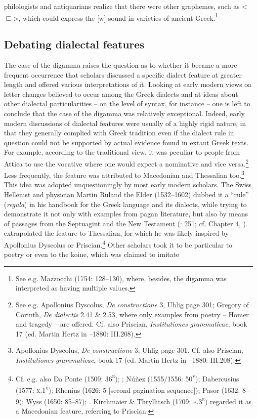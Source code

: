 \documentclass[output=paper]{langsci/langscibook}
\begin{document}
\begin{styleCatalogusnotities}
philologists and antiquarians realize that there were other graphemes, such as <${\sqsubset}$>, which could express the [w] sound in varieties of ancient Greek.\footnote{ \textrm{See e.g. Mazzocchi (1754: 128–130), where, besides, the digamma was interpreted as having multiple values.}}
\end{styleCatalogusnotities}

\subsection{Debating dialectal features}
\hypertarget{Toc19704847}{}
The case of the digamma raises the question as to whether it became a more frequent occurrence that scholars discussed a specific dialect feature at greater length and offered various interpretations of it. Looking at early modern views on letter changes believed to occur among the Greek dialects and at ideas about other dialectal particularities – on the level of syntax, for instance – one is left to conclude that the case of the digamma was relatively exceptional. Indeed, early modern discussions of dialectal features were usually of a highly rigid nature, in that they generally complied with Greek tradition even if the dialect rule in question could not be supported by actual evidence found in extant Greek texts. For example, according to the traditional view, it was peculiar to people from Attica to use the vocative where one would expect a nominative and vice versa.\footnote{See e.g. Apollonius Dyscolus, \textit{De} \textit{constructione} 3, Uhlig page 301; Gregory of Corinth, \textit{De} \textit{dialectis} 2.41 \& 2.53, where only examples from poetry – Homer and tragedy – are offered. Cf. also Priscian, \textit{Institutiones} \textit{grammaticae}, book 17 (ed. Martin Hertz in \citealt{Keil1855}–1880: III.208).} Less frequently, the feature was attributed to Macedonian and Thessalian too.\footnote{Apollonius Dyscolus, \textit{De} \textit{constructione} 3, Uhlig page 301. Cf. also Priscian, \textit{Institutiones} \textit{grammaticae}, book 17 (ed. Martin Hertz in \citealt{Keil1855}–1880: III.208).} This idea was adopted unquestioningly by most early modern scholars. The Swiss Hellenist and physician Martin Ruland the Elder (1532–1602) dubbed it a “rule” (\textit{regula}) in his handbook for the Greek language and its dialects, while trying to demonstrate it not only with examples from pagan literature, but also by means of passages from the Septuagint and the New Testament (\citealt{Ruland1556}: 251; cf. Chapter 4, ). \citet[302]{Ruland1556} extrapolated the feature to Thessalian, for which he was likely inspired by Apollonius Dyscolus or Priscian.\footnote{Cf. e.g. also Da Ponte (1509: 36\textsc{\textsuperscript{r}}); \citet[216]{Vergara1537}; Núñez (1555/1556: 50\textsc{\textsuperscript{v}}); Dabercusius (1577: \textsc{x.1}\textsc{\textsuperscript{v}}); Rhenius (1626: 5 [second pagination sequence]); Pasor (1632: 8–9); Wyss (1650: 85–87); \citet[88]{Leusden1670}. Kirchmaier \& Thryllitsch (1709: \textsc{b.3}\textsc{\textsuperscript{r}}) regarded it as a Macedonian feature, referring to Priscian.} Other scholars took it to be particular to poetry or even to the koine, which was claimed to imitate 
\end{document}
